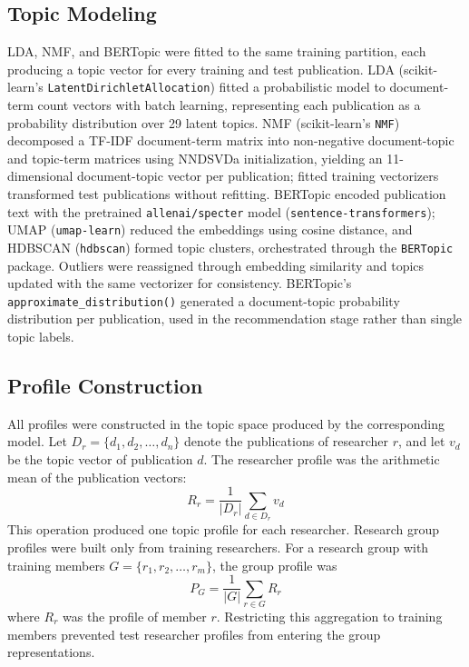 \subsection{Topic Modeling}
LDA, NMF, and BERTopic were fitted to the same training partition, each producing a topic vector for every training and test publication. LDA (scikit-learn's \texttt{LatentDirichletAllocation}) fitted a probabilistic model to document-term count vectors with batch learning, representing each publication as a probability distribution over 29 latent topics. NMF (scikit-learn's \texttt{NMF}) decomposed a TF-IDF document-term matrix into non-negative document-topic and topic-term matrices using NNDSVDa initialization, yielding an 11-dimensional document-topic vector per publication; fitted training vectorizers transformed test publications without refitting. BERTopic encoded publication text with the pretrained \texttt{allenai/specter} model (\texttt{sentence-transformers}); UMAP (\texttt{umap-learn}) reduced the embeddings using cosine distance, and HDBSCAN (\texttt{hdbscan}) formed topic clusters, orchestrated through the \texttt{BERTopic} package. Outliers were reassigned through embedding similarity and topics updated with the same vectorizer for consistency. BERTopic's \texttt{approximate\_distribution()} generated a document-topic probability distribution per publication, used in the recommendation stage rather than single topic labels.

\subsection{Profile Construction}
All profiles were constructed in the topic space produced by the corresponding model. Let $D_r = \{d_1, d_2, \dots, d_n\}$ denote the publications of researcher $r$, and let $v_d$ be the topic vector of publication $d$. The researcher profile was the arithmetic mean of the publication vectors:
\begin{equation}
R_r = \frac{1}{|D_r|} \sum_{d \in D_r} v_d
\label{eq:profile}
\end{equation}
This operation produced one topic profile for each researcher. Research group profiles were built only from training researchers. For a research group with training members $G = \{r_1, r_2, \dots, r_m\}$, the group profile was
\begin{equation}
P_G = \frac{1}{|G|} \sum_{r \in G} R_r
\label{eq:group}
\end{equation}
where $R_r$ was the profile of member $r$. Restricting this aggregation to training members prevented test researcher profiles from entering the group representations.

